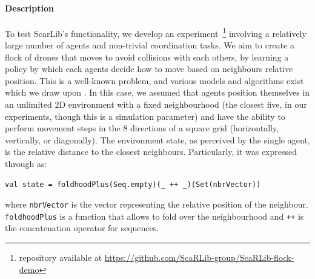 \paragraph{Description}
To test ScarLib's functionality, 
 we develop an experiment~\footnote{repository available at \url{https://github.com/ScaRLib-group/ScaRLib-flock-demo}}
 involving a relatively large number of agents 
 and non-trivial coordination tasks. 
% 
We aim to create a flock of drones 
 that moves to avoid collisions with each others, by learning a policy by which each 
 agents decide how to move based on neighbours relative position.
% 
This is a well-known problem, and various models and algorithms exist which we draw upon \cite{DBLP:conf/siggraph/Reynolds87,inverserl}. %
%
In this case, %
 we assumed that agents position themselves in an unlimited 2D environment 
 with a fixed neighbourhood (the closest five, in our experiments, though this is a simulation parameter)
 and have the ability to perform movement steps in the 8 directions of a square grid (horizontally, vertically, or diagonally).
%
The environment state, as perceived by the single agent, is the relative distance to the closest neighbours.
%
Particularly, it was expressed through \scafi{} as:
\begin{lstlisting}
val state = foldhoodPlus(Seq.empty)(_ ++ _)(Set(nbrVector))
\end{lstlisting}
where \texttt{nbrVector} is the vector representing the relative position of the neighbour.
\lstinline|foldhoodPlus| is a \scafi{} function that allows to fold over the neighbourhood 
 and \lstinline|++| is the concatenation operator for sequences.

